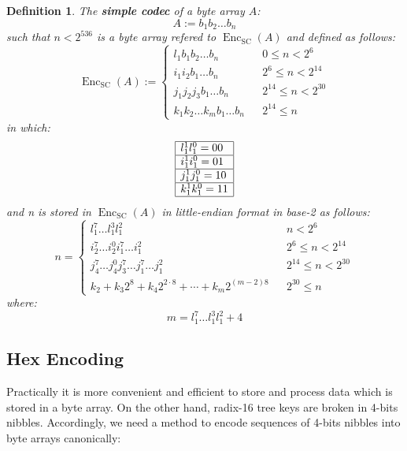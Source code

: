 \documentclass{article}
\newcommand{\assign}{:=}
\newcommand{\cdummy}{\cdot}
\newcommand{\nosymbol}{}
\newcommand{\tmop}[1]{\ensuremath{\operatorname{#1}}}
\newcommand{\tmstrong}[1]{\textbf{#1}}
\newcommand{\tmtextbf}[1]{{\bfseries{#1}}}
\newtheorem{definition}{Definition}
\providecommand{\cdummy}{{\cdot}}
\providecommand{\nosymbol}{}
\providecommand{\tmop}[1]{\ensuremath{\mathrm{#1}}}
\providecommand{\tmstrong}[1]{\tmtextbf{#1}}
\providecommand{\tmtextbf}[1]{\tmtextbf{#1}}
\newtheorem{definition}{Definition}
\begin{document}
\begin{definition}
  The {\tmstrong{simple codec}} of a byte array $A$:
  \[ A \assign b_1 b_2 \ldots b_n \]
  such that $n < 2^{536}$ is a byte array refered to $\tmop{Enc}_{\tmop{SC}}
  (A)$ and defined as follows:
  \[ \tmop{Enc}_{\tmop{SC}} (A) \assign \left\{ \begin{array}{lll}
       l^{\nosymbol}_1 b_1 b_2 \ldots b_n &  & 0 \leqslant n < 2^6\\
       i^{\nosymbol}_1 i^{\nosymbol}_2 b_1 \ldots b_n &  & 2^6 \leqslant n <
       2^{14}\\
       j^{\nosymbol}_1 j^{\nosymbol}_2 j_3 b_1 \ldots b_n &  & 2^{14}
       \leqslant n < 2^{30}\\
       k_1^{\nosymbol} k_2^{\nosymbol} \ldots k_m^{\nosymbol} b_1 \ldots b_n &
       & 2^{14} \leqslant n
     \end{array} \right. \]
  in which:
  \[ \begin{array}{|l|}
       \hline
       l^1_1 l_1^0 = 00\\
       \hline
       i^1_1 i_1^0 = 01\\
       \hline
       j^1_1 j_1^0 = 10\\
       \hline
       k^1_1 k_1^0 = 11\\
       \hline
     \end{array} \]
  and n is stored in $\tmop{Enc}_{\tmop{SC}} (A)$ in little-endian format in
  base-2 as follows:
  \[ n = \left\{ \begin{array}{lll}
       l^7_1 \ldots l^3_1 l^2_1 &  & n < 2^6\\
       i_2^7 \ldots i_2^0 i_1^7 \ldots i^2_1^{\nosymbol} &  & 2^6 \leqslant n
       < 2^{14}\\
       j_4^7 \ldots j_4^0 j_3^7 \ldots j_1^7 \ldots j^2_1 &  & 2^{14}
       \leqslant n < 2^{30}\\
       k_2 + k_3 2^8 + k_4 2^{2 \cdummy 8} + \cdots + k_m 2^{(m - 2) 8} &  &
       2^{30} \leqslant n
     \end{array} \right. \]
  where:
  \[ m = l^7_1 \ldots l^3_1 l^2_1 + 4 \]
\end{definition}

\subsection{Hex Encoding}

Practically it is more convenient and efficient to store and process data
which is stored in a byte array. On the other hand, radix-16 tree keys are
broken in 4-bits nibbles. Accordingly, we need a method to encode sequences of
4-bits nibbles into byte arrays canonically:
\end{document}
